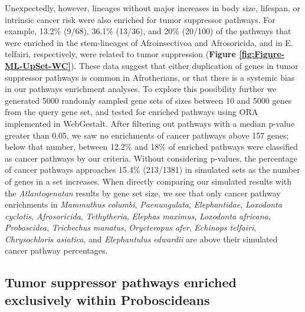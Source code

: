 \documentclass[]{elsarticle} %
\begin{document}
Unexpectedly, however, lineages without major increases in body size, lifespan, or intrinsic cancer risk were also enriched for tumor suppressor pathways. For example, 13.2\% (9/68), 36.1\% (13/36), and 20\% (20/100) of the pathways that were enriched in the stem-lineages of Afroinsectivoa and Afrosoricida, and in E. telfairi, respectively, were related to tumor suppression (\textbf{Figure \ref{fig:Figure-ML-UpSet-WC}}). These data suggest that either duplication of genes in tumor suppressor pathways is common in Afrotherians, or that there is a systemic bias in our pathways enrichment analyses. To explore this possibility further we generated 5000 randomly sampled gene sets of sizes between 10 and 5000 genes from the query gene set, and tested for enriched pathways using ORA implemented in WebGestalt. After filtering out pathways with a median p-value greater than 0.05, we saw no enrichments of cancer pathways above 157 genes; below that number, between 12.2\% and 18\% of enriched pathways were classified as cancer pathways by our criteria. Without considering p-values, the percentage of cancer pathways approaches 15.4\% (213/1381) in simulated sets as the number of genes in a set increases. When directly comparing our simulated results with the \emph{Atlantogenatan} results by gene set size, we see that only cancer pathway enrichments in \emph{Mammuthus columbi}, \emph{Paenungulata}, \emph{Elephantidae}, \emph{Loxodonta cyclotis}, \emph{Afrosoricida}, \emph{Tethytheria}, \emph{Elephas maximus}, \emph{Loxodonta africana}, \emph{Proboscidea}, \emph{Trichechus manatus}, \emph{Orycteropus afer}, \emph{Echinops telfairi}, \emph{Chrysochloris asiatica}, and \emph{Elephantulus edwardii} are above their simulated cancer pathway percentages.

\hypertarget{tumor-suppressor-pathways-enriched-exclusively-within-proboscideans}{%
\subsection{Tumor suppressor pathways enriched exclusively within Proboscideans}\label{tumor-suppressor-pathways-enriched-exclusively-within-proboscideans}}
\end{document}

